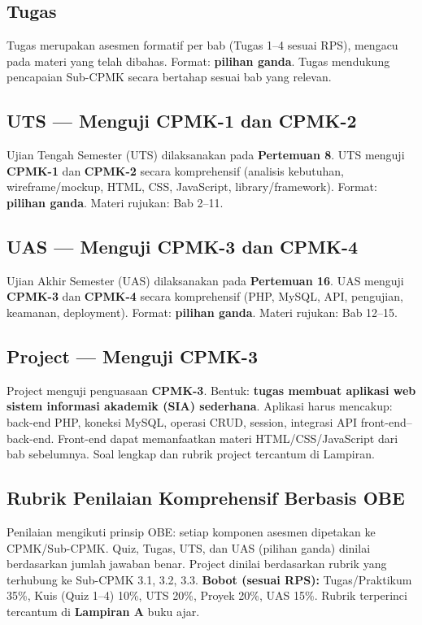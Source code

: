 \subsection{Tugas}

Tugas merupakan asesmen formatif per bab (Tugas 1--4 sesuai RPS), mengacu pada materi yang telah dibahas. Format: \textbf{pilihan ganda}. Tugas mendukung pencapaian Sub-CPMK secara bertahap sesuai bab yang relevan.

\subsection{UTS --- Menguji CPMK-1 dan CPMK-2}

Ujian Tengah Semester (UTS) dilaksanakan pada \textbf{Pertemuan 8}. UTS menguji \textbf{CPMK-1} dan \textbf{CPMK-2} secara komprehensif (analisis kebutuhan, wireframe/mockup, HTML, CSS, JavaScript, library/framework). Format: \textbf{pilihan ganda}. Materi rujukan: Bab 2--11.

\subsection{UAS --- Menguji CPMK-3 dan CPMK-4}

Ujian Akhir Semester (UAS) dilaksanakan pada \textbf{Pertemuan 16}. UAS menguji \textbf{CPMK-3} dan \textbf{CPMK-4} secara komprehensif (PHP, MySQL, API, pengujian, keamanan, deployment). Format: \textbf{pilihan ganda}. Materi rujukan: Bab 12--15.

\subsection{Project --- Menguji CPMK-3}

Project menguji penguasaan \textbf{CPMK-3}. Bentuk: \textbf{tugas membuat aplikasi web sistem informasi akademik (SIA) sederhana}. Aplikasi harus mencakup: back-end PHP, koneksi MySQL, operasi CRUD, session, integrasi API front-end--back-end. Front-end dapat memanfaatkan materi HTML/CSS/JavaScript dari bab sebelumnya. Soal lengkap dan rubrik project tercantum di Lampiran.

\subsection{Rubrik Penilaian Komprehensif Berbasis OBE}

Penilaian mengikuti prinsip OBE: setiap komponen asesmen dipetakan ke CPMK/Sub-CPMK. Quiz, Tugas, UTS, dan UAS (pilihan ganda) dinilai berdasarkan jumlah jawaban benar. Project dinilai berdasarkan rubrik yang terhubung ke Sub-CPMK 3.1, 3.2, 3.3. \textbf{Bobot (sesuai RPS):} Tugas/Praktikum 35\%, Kuis (Quiz 1--4) 10\%, UTS 20\%, Proyek 20\%, UAS 15\%. Rubrik terperinci tercantum di \textbf{Lampiran A} buku ajar.

